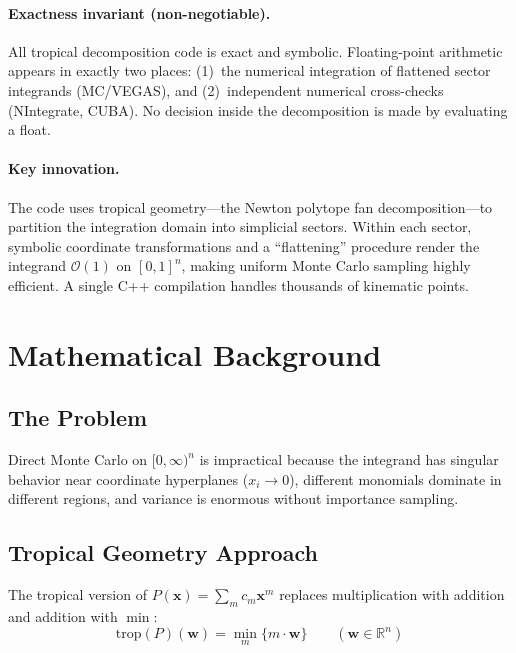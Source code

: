 \documentclass[11pt,a4paper]{article}
\begin{document}
\paragraph{Exactness invariant (non-negotiable).} All tropical decomposition code is exact and symbolic. Floating-point arithmetic appears in exactly two places: (1)~the numerical integration of flattened sector integrands (MC/VEGAS), and (2)~independent numerical cross-checks (NIntegrate, CUBA). No decision inside the decomposition is made by evaluating a float.

\paragraph{Key innovation.} The code uses tropical geometry---the Newton polytope fan decomposition---to partition the integration domain into simplicial sectors. Within each sector, symbolic coordinate transformations and a ``flattening'' procedure render the integrand $\mathcal{O}(1)$ on $[0,1]^n$, making uniform Monte Carlo sampling highly efficient. A single C++ compilation handles thousands of kinematic points.

\section{Mathematical Background}

\subsection{The Problem}

Direct Monte Carlo on $[0,\infty)^n$ is impractical because the integrand has singular behavior near coordinate hyperplanes ($x_i \to 0$), different monomials dominate in different regions, and variance is enormous without importance sampling.

\subsection{Tropical Geometry Approach}

The tropical version of $P(\mathbf{x}) = \sum_m c_m \mathbf{x}^m$ replaces multiplication with addition and addition with $\min$:
\begin{equation}
\mathrm{trop}(P)(\mathbf{w}) = \min_m \{ m \cdot \mathbf{w} \} \qquad (\mathbf{w} \in \mathbb{R}^n)
\end{equation}
\end{document}
